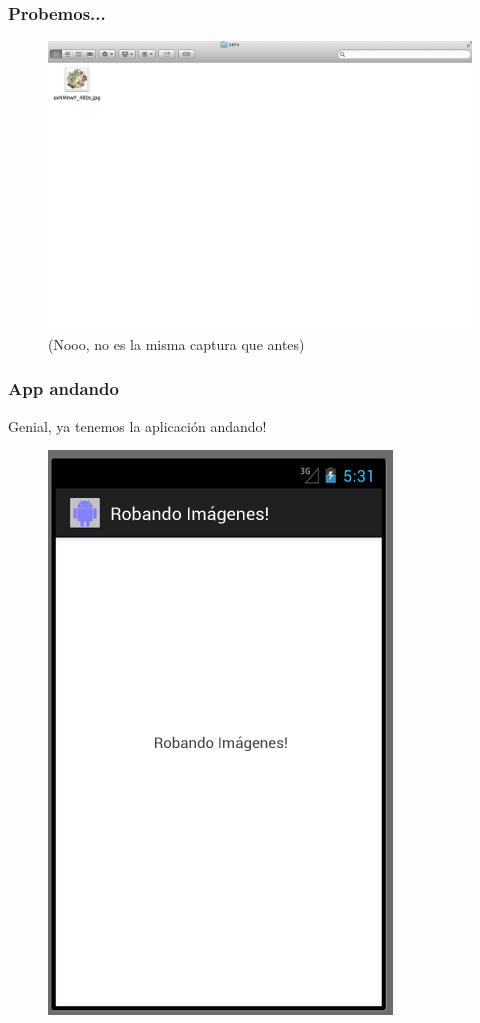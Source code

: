 \documentclass[ignorenonframetext,]{beamer}
\begin{document}
\begin{frame}\frametitle{Probemos...}
	\begin{figure}[htbp]
		\centering
		\includegraphics[scale=0.20]{anduvo.png}
		\caption*{(Nooo, no es la misma captura que antes)}
	\end{figure}
\end{frame}

\begin{frame}\frametitle{App andando}
	Genial, ya tenemos la aplicación andando!
	\begin{figure}[htbp]
		\centering
		\includegraphics[scale=0.30]{appFea.png}
	\end{figure}
\end{frame}
\end{document}
